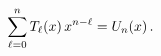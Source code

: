 \[\sum_{\ell=0}^{n}\mathop{T_{\ell}\/}\nolimits\!\left(x\right)x^{n-\ell}=%
\mathop{U_{n}\/}\nolimits\!\left(x\right).\]